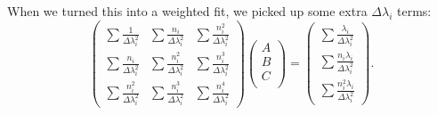 \documentclass[12pt,twoside]{reedthesis}
\newcommand{\eqn}[1]{\begin{equation}#1\end{equation}}
\begin{document}
When we turned this into a weighted fit, we picked up some extra $\Delta \lambda_i$ terms:
\eqn{
\left(
\begin{array}{ccc}
\sum \frac{1}{\Delta \lambda_i^2} & \sum \frac{n_i}{\Delta \lambda_i^2} &  \sum \frac{n_i^2}{\Delta \lambda_i^2} \\
\sum \frac{n_i}{\Delta \lambda_i^2} & \sum \frac{n_i ^2}{\Delta \lambda_i^2} & \sum \frac{n_i^3}{\Delta \lambda_i^2} \\
\sum \frac{n_i ^2}{\Delta \lambda_i^2} & \sum \frac{n_i^3}{\Delta \lambda_i^2} & \sum \frac{n_i ^4}{\Delta \lambda_i^2}
\end{array}
\right)
\left(
\begin{array}{c}
A \\
B \\
C \\
\end{array}
\right)
=
\left(
\begin{array}{c}
\sum \frac{\lambda_i}{\Delta \lambda_i^2} \\
\sum \frac{n_i \lambda_i}{\Delta \lambda_i^2} \\
\sum \frac{n_i^2 \lambda_i}{\Delta \lambda_i^2}
\end{array}
\right)
\mbox{.}
}
\end{document}
